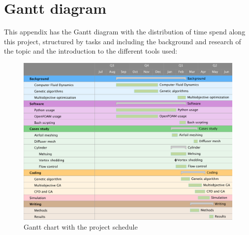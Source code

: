 \chapter{Gantt diagram}

This appendix has the Gantt diagram with the distribution of time spend along this project, structured by tasks and including the background and research of the topic and the introduction to the different tools used:
    
    \begin{figure}[h!]
        \centering
        \includegraphics[width=1\textwidth]{Figures/others/GanttDiagram.png} 
        \caption{Gantt chart with the project schedule}
        \label{fig:Gantt}
    \end{figure}    
